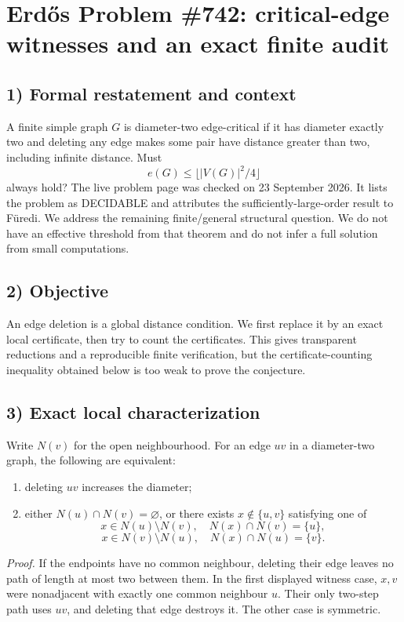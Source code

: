 \section{Erd\H{o}s Problem \#742: critical-edge witnesses and an exact finite audit}

\subsection*{1) Formal restatement and context}
A finite simple graph $G$ is diameter-two edge-critical if it has diameter exactly two and deleting any edge makes some pair have distance greater than two, including infinite distance. Must
\[
 e(G)\leq\lfloor |V(G)|^2/4\rfloor
\]
always hold? The live problem page was checked on 23 September 2026. It lists the problem as DECIDABLE and attributes the sufficiently-large-order result to F\"uredi. We address the remaining finite/general structural question. We do not have an effective threshold from that theorem and do not infer a full solution from small computations.

\subsection*{2) Objective}
An edge deletion is a global distance condition. We first replace it by an exact local certificate, then try to count the certificates. This gives transparent reductions and a reproducible finite verification, but the certificate-counting inequality obtained below is too weak to prove the conjecture.

\subsection*{3) Exact local characterization}
Write $N(v)$ for the open neighbourhood. For an edge $uv$ in a diameter-two graph, the following are equivalent:
\begin{enumerate}
\item deleting $uv$ increases the diameter;
\item either $N(u)\cap N(v)=\varnothing$, or there exists $x\notin\{u,v\}$ satisfying one of
\[
 x\in N(u)\setminus N(v),\quad N(x)\cap N(v)=\{u\},
\]
\[
 x\in N(v)\setminus N(u),\quad N(x)\cap N(u)=\{v\}.
\]
\end{enumerate}
\emph{Proof.} If the endpoints have no common neighbour, deleting their edge leaves no path of length at most two between them. In the first displayed witness case, $x,v$ were nonadjacent with exactly one common neighbour $u$. Their only two-step path uses $uv$, and deleting that edge destroys it. The other case is symmetric.

